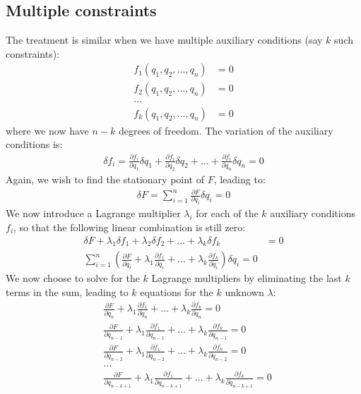 \subsection{Multiple constraints}
The treatment is similar when we have multiple auxiliary conditions (say $k$ such constraints):
\begin{align}
f_1(q_1, q_2, \dots, q_n)&=0\nonumber\\
f_2(q_1, q_2, \dots, q_n)&=0\nonumber\\
\dots\nonumber\\
f_k(q_1, q_2, \dots, q_n)&=0
\end{align}
where we now have $n-k$ degrees of freedom. The variation of the auxiliary conditions is:
\begin{align}
\delta f_i=\frac{\partial f_i}{\partial q_1}\delta q_1 + \frac{\partial f_i}{\partial q_2}\delta q_2 +\dots+\frac{\partial f_i}{\partial q_n}\delta q_n=0
\end{align}
Again, we wish to find the stationary point of $F$, leading to:
\begin{align}
\delta F = \sum_{i=1}^{n}\frac{\partial F}{\partial q_i}\delta q_i=0
\end{align}
We now introduce a Lagrange multiplier $\lambda_i$ for each of the $k$ auxiliary conditions $f_i$, so that the following linear combination is still zero:
\begin{align}
\label{eqn:multilagrangemulti}
\delta F + \lambda_1 \delta f_1 +\lambda_2 \delta f_2 +\dots+\lambda_k \delta f_k&=0\nonumber\\
\sum_{i=1}^{n}\left(\frac{\partial F}{\partial q_i}+\lambda_1 \frac{\partial f_1}{\partial q_i}+\dots +\lambda_k \frac{\partial f_k}{\partial q_i}\right)\delta q_i=0
\end{align}
We now choose to solve for the $k$ Lagrange multipliers by eliminating the last $k$ terms in the sum, leading to $k$ equations for the $k$ unknown $\lambda$:
\begin{align}
\label{eqn:multilagrangemulti2}
&\frac{\partial F}{\partial q_n}+\lambda_1 \frac{\partial f_1}{\partial q_n}+\dots +\lambda_k \frac{\partial f_k}{\partial q_n}=0\nonumber\\
&\frac{\partial F}{\partial q_{n-1}}+\lambda_1 \frac{\partial f_1}{\partial q_{n-1}}+\dots +\lambda_k \frac{\partial f_k}{\partial q_{n-1}}=0\nonumber\\
&\frac{\partial F}{\partial q_{n-2}}+\lambda_1 \frac{\partial f_1}{\partial q_{n-2}}+\dots +\lambda_k \frac{\partial f_k}{\partial q_{n-2}}=0\nonumber\\
&\dots \nonumber\\
&\frac{\partial F}{\partial q_{n-k+1}}+\lambda_1 \frac{\partial f_1}{\partial q_{n-k+1}}+\dots +\lambda_k \frac{\partial f_k}{\partial q_{n-k+1}}=0
\end{align}
